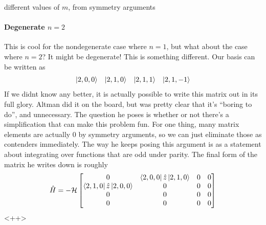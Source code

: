 \documentclass{article}
\theoremstyle{definition}
\begin{document}
different values of $m$, from symmetry arguments \paragraph{Degenerate $n=2$} This is cool for the nondegenerate case where $n=1$, but what about the case where $n=2$? It might be degenerate! This is something different. Our basis can be written as \begin{align} \ket{2,0,0} && \ket{2,1,0} && \ket{2,1,1} && \ket{2,1,-1} \end{align} If we didnt know any better, it is actually possible to write this matrix out in its full glory. Altman did it on the board, but was pretty clear that it's ``boring to do'', and unnecessary. The question he poses is whether or not there's a simplification that can make this problem fun. For one thing, many matrix elements are actually 0 by symmetry arguments, so we can just eliminate those as contenders immediately. The way he keeps posing this argument is as a statement about integrating over functions that are odd under parity. The final form of the matrix he writes down is roughly \begin{equation} \hat H=-\mathcal H\begin{bmatrix} 0 & \bra{2,0,0}\hat z\ket{2,1,0} & 0 & 0 \\ \bra{2,1,0}\hat z\ket{2,0,0} & 0 & 0 &0 \\ 0 & 0 & 0 & 0 \\ 0 & 0 & 0 & 0 \\ \end{bmatrix} \end{equation} <++>
\end{document}
